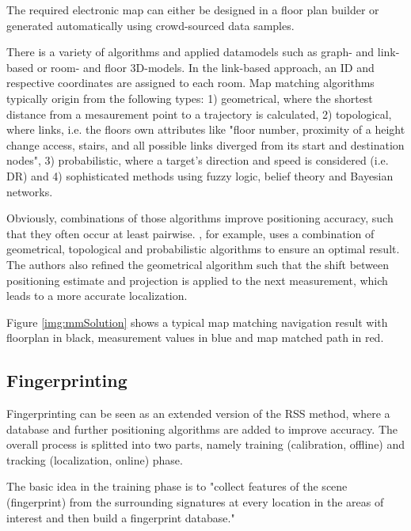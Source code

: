 The required electronic map can either be designed in a floor plan builder or generated automatically using crowd-sourced data samples. 

There is a variety of algorithms and applied datamodels such as graph- and link-based or room- and floor 3D-models. In the link-based approach, an ID and respective coordinates are assigned to each room. 
Map matching algorithms typically origin from the following types: 
1) geometrical, where the shortest distance from a mesaurement point to a trajectory is calculated, 2) topological, where links, i.e. the floors own attributes like "floor number, proximity of a height change access, stairs, and all possible links diverged from its start and destination nodes"\cite{mmSystem}, 3) probabilistic, where a target's direction and speed is considered (i.e. DR) and 4) sophisticated methods using fuzzy logic, belief theory and Bayesian networks.

Obviously, combinations of those algorithms improve positioning accuracy, such that they often occur at least pairwise. \cite{mmSystem}, for example, uses a combination of geometrical, topological and probabilistic algorithms to ensure an optimal result. The authors also refined the geometrical algorithm such that the shift between positioning estimate and projection is applied to the next measurement, which leads to a more accurate localization.

Figure \ref{img:mmSolution}	shows a typical map matching navigation result with floorplan in black, measurement values in blue and map matched path in red.


\subsection{Fingerprinting}

Fingerprinting can be seen as an extended version of the RSS method, where a database and further positioning algorithms are added to improve accuracy. 
The overall process is splitted into two parts, namely training (calibration, offline) and tracking (localization, online) phase.

The basic idea in the training phase is to "collect features of the scene (fingerprint) from the surrounding signatures at every location in the areas of interest and then build a fingerprint database." \cite{recentAdvances} 

